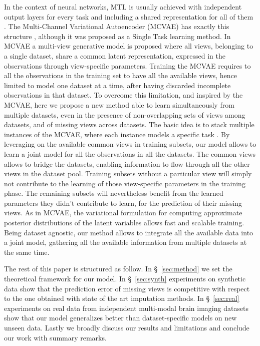 In the context of neural networks, MTL is usually achieved with independent output layers for every task and including a shared representation for all of them \citep{Dorado-Moreno2020}.
The Multi-Channel Variational Autoencoder (MCVAE) \citep{Antelmi2019} has exactly this structure , although it was proposed as a Single Task learning method.
In MCVAE a multi-view generative model is proposed where all views, belonging to a single dataset, share a common latent representation, expressed in the observations through view-specific parameters.
Training the MCVAE requires to all the observations in the training set to have all the available views, hence limited to model one dataset at a time, after having discarded incomplete observations in that dataset.
%
To overcome this limitation, and inspired by the MCVAE, here we propose a new method able to learn simultaneously from multiple datasets, even in the presence of non-overlapping sets of views among datasets, and of missing views across datasets.
The basic idea is to stack multiple instances of the MCVAE, where each instance models a specific task .
By leveraging on the available common views in training subsets, our model allows to learn a joint model for all the observations in all the datasets.
The common views allows to bridge the datasets, enabling information to flow through all the other views in the dataset pool.
Training subsets without a particular view will simply not contribute to the learning of those view-specific parameters in the training phase.
The remaining subsets will nevertheless benefit from the learned parameters they didn't contribute to learn, for the prediction of their missing views.
As in MCVAE, the variational formulation for computing approximate posterior distributions of the latent variables allows fast and scalable training.
Being dataset agnostic, our method allows to integrate all the available data into a joint model, gathering  all the available information from multiple datasets at the same time.

The rest of this paper is structured as follow.
In \S~\ref{sec:method} we set the theoretical framework for our model.
In \S~\ref{sec:synth} experiments on synthetic data show that the prediction error of missing views is competitive with respect to the one obtained with state of the art imputation methods.
In \S~\ref{sec:real} experiments on real data from independent multi-modal brain imaging datasets show that our model generalizes better than dataset-specific models on new unseen data.
Lastly we broadly discuss our results and limitations and conclude our work with summary remarks.
